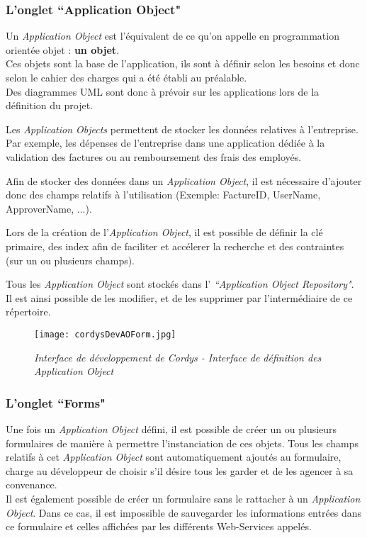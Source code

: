 \subsubsection{L'onglet ``Application Object"}

Un \emph{Application Object} est l'équivalent de ce qu'on appelle en programmation orientée objet : \textbf{un objet}.\\
Ces objets sont la base de l'application, ils sont à définir selon les besoins et donc selon le cahier des charges qui a été établi au préalable.\\
Des diagrammes UML sont donc à prévoir sur les applications lors de la définition du projet.

Les \emph{Application Objects} permettent de stocker les données relatives à l'entreprise. Par exemple, les dépenses de l'entreprise dans une application dédiée à la validation des factures ou au remboursement des frais des employés.

Afin de stocker des données dans un \emph{Application Object}, il est nécessaire d'ajouter donc des champs relatifs à l'utilisation (Exemple: FactureID, UserName, ApproverName, ...).

Lors de la création de l'\emph{Application Object}, il est possible de définir la clé primaire, des index afin de faciliter et accélerer la recherche et des contraintes (sur un ou plusieurs champs).

Tous les \emph{Application Object} sont stockés dans l' \emph{``Application Object Repository"}. Il est ainsi possible de les modifier, et de les supprimer par l'intermédiaire de ce répertoire.

 \begin{figure}[H]
    \centering
    \texttt{[image: cordysDevAOForm.jpg]}
	\caption{\textit{Interface de développement de Cordys - Interface de définition des Application Object}}\label{image.CordysDevAOForm} 
\end{figure}

\clearpage

\subsubsection{L'onglet ``Forms"}

Une fois un \emph{Application Object} défini, il est possible de créer un ou plusieurs formulaires de manière à permettre l'instanciation de ces objets. Tous les champs relatifs à cet \emph{Application Object} sont automatiquement ajoutés au formulaire, charge au développeur de choisir s'il désire tous les garder et de les agencer à sa convenance.\\
Il est également possible de créer un formulaire sans le rattacher à un \emph{Application Object}. Dans ce cas, il est impossible de sauvegarder les informations entrées dans ce formulaire et celles affichées par les différents Web-Services appelés.


